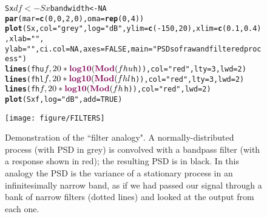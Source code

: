 \documentclass[11pt]{article}\usepackage{graphicx, color}
\makeatletter
\def\maxwidth{ %
  \ifdim\Gin@nat@width>\linewidth
    \linewidth
  \else
    \Gin@nat@width
  \fi
}
\newcommand{\hlfunctioncall}[1]{\textcolor[rgb]{0.501960784313725,0,0.329411764705882}{\textbf{#1}}}%
\newcommand{\hlstring}[1]{\textcolor[rgb]{0.6,0.6,1}{#1}}%
\newenvironment{kframe}{%
 \def\at@end@of@kframe{}%
 \ifinner\ifhmode%
  \def\at@end@of@kframe{\end{minipage}}%
  \begin{minipage}{\columnwidth}%
 \fi\fi%
 \def\FrameCommand##1{\hskip\@totalleftmargin \hskip-\fboxsep
 \colorbox{shadecolor}{##1}\hskip-\fboxsep
     \hskip-\linewidth \hskip-\@totalleftmargin \hskip\columnwidth}%
 \MakeFramed {\advance\hsize-\width
   \@totalleftmargin\z@ \linewidth\hsize
   \@setminipage}}%
 {\par\unskip\endMakeFramed%
 \at@end@of@kframe}
\newenvironment{knitrout}{}{} %
\makeatother
\begin{document}
%
\begin{figure}[htb!]
\begin{center}
\begin{knitrout}
\color{fgcolor}\begin{kframe}
\begin{alltt}
Sx$df <- Sx$bandwidth <- NA
\hlfunctioncall{par}(mar = \hlfunctioncall{c}(0, 0, 2, 0), oma = \hlfunctioncall{rep}(0, 4))
\hlfunctioncall{plot}(Sx, col = \hlstring{"grey"}, log = \hlstring{"dB"}, ylim = \hlfunctioncall{c}(-150, 20), xlim = \hlfunctioncall{c}(0.1, 0.4), xlab = \hlstring{""}, 
    ylab = \hlstring{""}, ci.col = NA, axes = FALSE, main = \hlstring{"PSDs of raw and filtered process"})
\hlfunctioncall{lines}(fhu$f, 20 * \hlfunctioncall{log10}(\hlfunctioncall{Mod}(fhu$h)), col = \hlstring{"red"}, lty = 3, lwd = 2)
\hlfunctioncall{lines}(fhl$f, 20 * \hlfunctioncall{log10}(\hlfunctioncall{Mod}(fhl$h)), col = \hlstring{"red"}, lty = 3, lwd = 2)
\hlfunctioncall{lines}(fh$f, 20 * \hlfunctioncall{log10}(\hlfunctioncall{Mod}(fh$h)), col = \hlstring{"red"}, lwd = 2)
\hlfunctioncall{plot}(Sxf, log = \hlstring{"dB"}, add = TRUE)
\end{alltt}
\end{kframe}
\texttt{[image: figure/FILTERS]} 

\end{knitrout}

\caption{Demonstration of the ``filter analogy". 
A normally-distributed
process (with PSD in grey) is convolved with a bandpass
filter (with a response shown in red); the resulting PSD is in black.
In this analogy the PSD is the variance of a stationary 
process in an infinitesimally narrow band, as if we had 
passed our signal through a bank of narrow filters (dotted lines)
and looked at the output from each one.
}
\label{fig:filter}
\end{center}
\end{figure}
\end{document}
